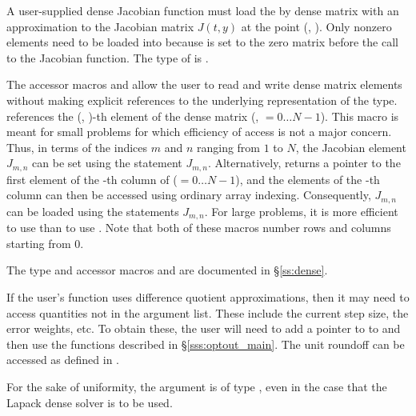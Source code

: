 {
  A user-supplied dense Jacobian function must load the  by 
  dense matrix  with an approximation to the Jacobian matrix $J(t,y)$
  at the point (, ).  Only nonzero elements need to be loaded
  into  because  is set to the zero matrix before the call
  to the Jacobian function. The type of  is . 
  
  The accessor macros  and  allow the user to
  read and write dense matrix elements without making explicit
  references to the underlying representation of the 
  type.  references the (, )-th
  element of the dense matrix  (, $= 0\ldots N-1$). This macro
  is meant for small problems for which efficiency of access is not a major
  concern.  Thus, in terms of the indices $m$ and $n$ ranging from $1$ to
  $N$, the Jacobian element $J_{m,n}$ can be set using the statement
   $J_{m,n}$.  Alternatively,
   returns a pointer to the first element of
  the -th column of  ($= 0\ldots N-1$), and the 
  elements of the -th column
  can then be accessed using ordinary array indexing.  Consequently, $J_{m,n}$ can be 
  loaded using the statements 
   $J_{m,n}$.  For large problems, it is more 
  efficient to use  than to use . 
  Note that both of these macros number rows and columns
  starting from $0$.  

  The  type and accessor macros  and 
   are documented in \S\ref{ss:dense}.

  If the user's  function uses difference quotient
  approximations, then it may need to access quantities not in the argument
  list. These include the current step size, the error weights, etc.
  To obtain these, the user will need to add a pointer to  
  to  and then use the  functions described in
  \S\ref{sss:optout_main}. The unit roundoff can be accessed as
   defined in .
  
  For the sake of uniformity, the argument  is of type ,
  even in the case that the Lapack dense solver is to be used.
}

